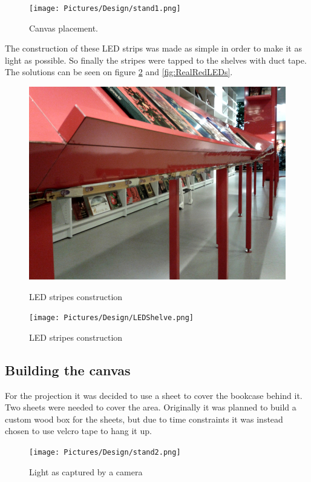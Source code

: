 \begin{figure}[htbp] 
\centering 
\texttt{[image: Pictures/Design/stand1.png]} 
\caption{Canvas placement.}
\label{fig:LEDsPosition} 
\end{figure}

The construction of these LED strips was made as simple in order to make it as light as possible. So finally the stripes were tapped to the shelves with duct tape. The solutions can be seen on figure \ref{fig:RealLEDs} and \ref{fig:RealRedLEDs}.

\begin{figure}[htbp] \centering
\begin{minipage}[b]{0.45\textwidth} \centering
\includegraphics[width=1.00\textwidth]{Pictures/Design/LEDRedShelve.png}
\caption{LED stripes construction}
\label{fig:RealRedLEDs}
\end{minipage} \hfill
\begin{minipage}[b]{0.45\textwidth} \centering
\texttt{[image: Pictures/Design/LEDShelve.png]} 
\caption{LED stripes construction}
\label{fig:RealLEDs}
\end{minipage} \hfill
\end{figure}

\subsection{Building the canvas}
For the projection it was decided to use a sheet to cover the bookcase behind it. Two sheets were needed to cover the area. Originally it was planned to build a custom wood box for the sheets, but due to time constraints it was instead chosen to use velcro tape to hang it up.
\begin{figure}[htbp] 
\centering 
\texttt{[image: Pictures/Design/stand2.png]} 
\caption{Light as captured by a camera} 
\label{fig:CanvasPosition} 
\end{figure}

